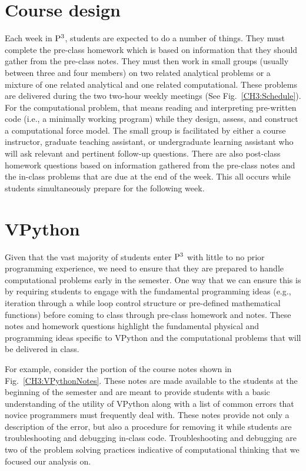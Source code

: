 \documentclass{msuphddissertation}
\begin{document}
\begin{doublespace}
\section{Course design}

Each week in ${\rm P}^{3}$, students are expected to do a number of things. They must complete the pre-class homework which is based on information that they should gather from the pre-class notes.  They must then work in small groups (usually between three and four members) on two related analytical problems or a mixture of one related analytical and one related computational.  These problems are delivered during the two two-hour weekly meetings (See Fig.~\ref{CH3:Schedule}).  For the computational problem, that means reading and interpreting pre-written code (i.e., a minimally working program) while they design, assess, and construct a computational force model.  The small group is facilitated by either a course instructor, graduate teaching assistant, or undergraduate learning assistant who will ask relevant and pertinent follow-up questions.  There are also post-class homework questions based on information gathered from the pre-class notes and the in-class problems that are due at the end of the week.  This all occurs while students simultaneously prepare for the following week.

\section{VPython}

Given that the vast majority of students enter ${\rm P}^{3}$ with little to no prior programming experience, we need to ensure that they are prepared to handle computational problems early in the semester.  One way that we can ensure this is by requiring students to engage with the fundamental programming ideas (e.g., iteration through a while loop control structure or pre-defined mathematical functions) before coming to class through pre-class homework and notes.  These notes and homework questions highlight the fundamental physical and programming ideas specific to VPython and the computational problems that will be delivered in class.

For example, consider the portion of the course notes shown in Fig.~\ref{CH3:VPythonNotes}.  These notes are made available to the students at the beginning of the semester and are meant to provide students with a basic understanding of the utility of VPython along with a list of common errors that novice programmers must frequently deal with.  These notes provide not only a description of the error, but also a procedure for removing it while students are troubleshooting and debugging in-class code.  Troubleshooting and debugging are two of the problem solving practices indicative of computational thinking that we focused our analysis on.


\end{doublespace}
\end{document}
